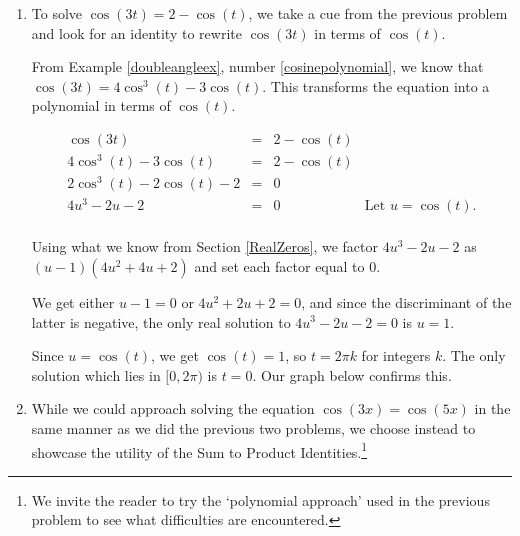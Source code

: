 \documentclass{ximera}
\begin{document}
\begin{example}
\begin{explanation}
\begin{enumerate}
 

The answers which lie in $[0,2\pi)$ are $t =0$,  $\frac{\pi}{3}$, and $\frac{5\pi}{3}$.  Graphing $y = \cos(2t)$ and $y = 3\cos(t) - 2$, we find that the curves intersect in three places on $[0,2\pi)$ and confirm our results.

\begin{center}
\end{center}



\item  To solve $\cos(3t) = 2- \cos(t)$, we take a cue from the previous problem and look for an identity to rewrite $\cos(3t)$ in terms of $\cos(t)$.

 

  From Example \ref{doubleangleex}, number \ref{cosinepolynomial}, we know that $\cos(3t) = 4\cos^{3}(t) - 3\cos(t)$.  This transforms the equation into a polynomial in terms of $\cos(t)$.


\[ \begin{array}{rclr}

\cos(3t) & = &2- \cos(t) & \\
4\cos^{3}(t) - 3\cos(t) & = & 2- \cos(t) & \\
2\cos^{3}(t) - 2\cos(t) -2  & = & 0 & \\
4 u^3 - 2 u -2  & = & 0 & \text{Let $u = \cos(t)$.} \\ \end{array} \]

Using what we know from Section \ref{RealZeros}, we factor $4u^3-2u-2$ as $(u-1)\left(4u^2+4u+2\right)$ and set each factor equal to $0$.  

 

We get either $u-1 = 0$ or  $4u^2+2u+2=0$, and since the discriminant of the latter is negative, the only real solution to $4u^3-2u-2=0$ is $u = 1$.  


 

Since $u = \cos(t)$, we get $\cos(t) = 1$, so $t = 2\pi k$ for integers $k$.  The only solution which lies in $[0,2\pi)$ is $t = 0$.  Our graph below confirms this.

\begin{center}
\end{center}


\item  While we could approach solving the equation $\cos(3x) = \cos(5x)$ in the same manner as we did the previous two problems, we choose instead to showcase the utility of the Sum to Product Identities.\footnote{We invite the reader to try the `polynomial approach' used in the previous problem to see what difficulties are encountered.}


\end{enumerate}
\end{explanation}
\end{example}
\end{document}
